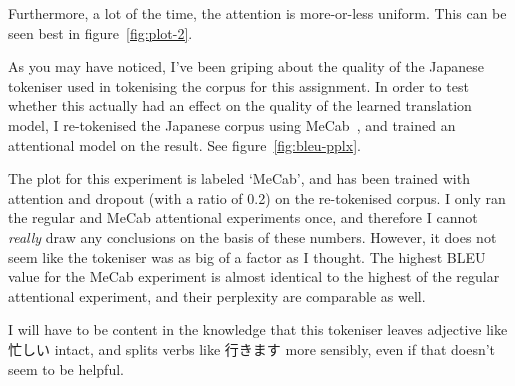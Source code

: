 \documentclass[answers]{exam}
\begin{document}
\begin{CJK}{UTF8}{min}
\begin{questions}
\begin{framed}
  Furthermore, a lot of the time, the attention is more-or-less uniform. This
  can be seen best in figure~\ref{fig:plot-2}.
\end{framed}

\clearpage

\begin{framed}
  As you may have noticed, I've been griping about the quality of the Japanese
  tokeniser used in tokenising the corpus for this assignment.
  In order to test whether this actually had an effect on the quality of the
  learned translation model, I re-tokenised the Japanese corpus using
  MeCab~\citep{Kudo-2005}, and trained an attentional model on the result. See
  figure~\ref{fig:bleu-pplx}.

  The plot for this experiment is labeled `MeCab', and has been trained with
  attention and dropout (with a ratio of 0.2) on the re-tokenised corpus.
  I only ran the regular and MeCab attentional experiments once, and therefore I
  cannot \emph{really} draw any conclusions on the basis of these numbers.
  However, it does not seem like the tokeniser was as big of a factor as I
  thought. The highest BLEU value for the MeCab experiment is almost identical
  to the highest of the regular attentional experiment, and their perplexity are
  comparable as well.

  I will have to be content in the knowledge that this tokeniser leaves
  adjective like 忙しい intact, and splits verbs like 行きます more sensibly,
  even if that doesn't seem to be helpful.
\end{framed}

\end{questions}





\end{CJK}
\end{document}
